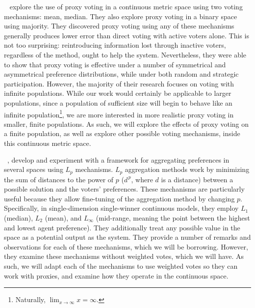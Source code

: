 ~\cite{Cohensius2017} explore the use of proxy voting in a
continuous metric space using two voting mechanisms: mean, median.
They also explore proxy voting in a binary space using majority.
They discovered proxy voting using any of these mechanisms generally produces lower
error than direct voting with active voters alone.
This is not too surprising: reintroducing information lost through inactive voters,
regardless of the method, ought to help the system.
Nevertheless, they were able to show that proxy voting is effective under a number of
symmetrical and asymmetrical preference distributions, while under both random and
strategic participation.
However, the majority of their research focuses on voting with infinite populations.
While our work would certainly be applicable to larger populations, since a
population of sufficient size will begin to behave like an infinite population\footnote{
    Naturally, $\lim_{x \rightarrow \infty} x = \infty$.
}, we are more interested in more realistic proxy voting in smaller, finite populations.
As such, we will explore the effects of proxy voting on a finite population, as well
as explore other possible voting mechanisms, inside this continuous metric space.

~\cite{Bulteau2021}, develop and experiment with a framework for
aggregating preferences in several spaces using $L_p$ mechanisms.
$L_p$ aggregation methods work by minimizing the sum of distances to the power of $p$
($d^{\,p}$, where $d$ is a distance) between a possible solution and the voters'
preferences.
These mechanisms are particularly useful because they allow fine-tuning of the
aggregation method by changing $p$.
Specifically, in single-dimension single-winner continuous models, they employ $L_1$
(median),
$L_2$ (mean), and $L_{\infty}$ (mid-range, meaning the point between the highest and
lowest agent preference).
They additionally treat any possible value in the space as a potential output as the
system.
They provide a number of remarks and observations for each of these mechanisms, which
we will be borrowing.
However, they examine these mechanisms without weighted votes, which we will have.
As such, we will adapt each of the mechanisms to use weighted votes so they can work
with proxies, and examine how they operate in the continuous space.

